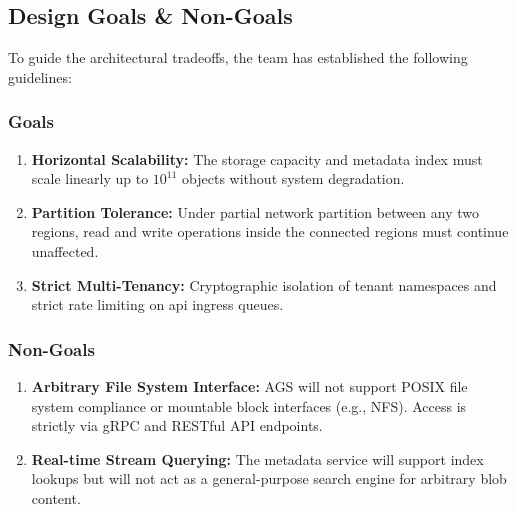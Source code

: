 \subsection{Design Goals \& Non-Goals}
To guide the architectural tradeoffs, the team has established the following guidelines:

\subsubsection{Goals}
\begin{enumerate}
    \item \textbf{Horizontal Scalability:} The storage capacity and metadata index must scale linearly up to $10^{11}$ objects without system degradation.
    \item \textbf{Partition Tolerance:} Under partial network partition between any two regions, read and write operations inside the connected regions must continue unaffected.
    \item \textbf{Strict Multi-Tenancy:} Cryptographic isolation of tenant namespaces and strict rate limiting on api ingress queues.
\end{enumerate}

\subsubsection{Non-Goals}
\begin{enumerate}
    \item \textbf{Arbitrary File System Interface:} AGS will not support POSIX file system compliance or mountable block interfaces (e.g., NFS). Access is strictly via gRPC and RESTful API endpoints.
    \item \textbf{Real-time Stream Querying:} The metadata service will support index lookups but will not act as a general-purpose search engine for arbitrary blob content.
\end{enumerate}
